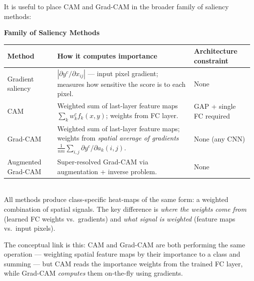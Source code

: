 \documentclass[11pt,a4paper]{article}
\begin{document}
It is useful to place CAM and Grad-CAM in the broader family of saliency methods:

\begin{tcolorbox}[colback=NoteGrayBg,colframe=NoteGray,boxrule=0.8pt,arc=3pt]
\textbf{Family of Saliency Methods}\\[4pt]
\begin{tabularx}{\linewidth}{@{}l X l@{}}
\toprule
\textbf{Method} & \textbf{How it computes importance} & \textbf{Architecture constraint} \\
\midrule
Gradient saliency & $\left|\partial y^c / \partial x_{ij}\right|$ — input pixel gradient; measures how sensitive the score is to each pixel. & None \\[4pt]
CAM & Weighted sum of last-layer feature maps $\sum_k w_k^c f_k(x,y)$; weights from FC layer. & GAP + single FC required \\[4pt]
Grad-CAM & Weighted sum of last-layer feature maps; weights from \emph{spatial average of gradients} $\frac{1}{nm}\sum_{i,j}\partial y^c/\partial a_k(i,j)$. & None (any CNN) \\[4pt]
Augmented Grad-CAM & Super-resolved Grad-CAM via augmentation + inverse problem. & None \\
\bottomrule
\end{tabularx}\\[4pt]
All methods produce class-specific heat-maps of the same form: a weighted combination of spatial signals. The key difference is \emph{where the weights come from} (learned FC weights vs.\ gradients) and \emph{what signal is weighted} (feature maps vs.\ input pixels).
\end{tcolorbox}

The conceptual link is this: CAM and Grad-CAM are both performing the same operation — weighting spatial feature maps by their importance to a class and summing — but CAM reads the importance weights from the trained FC layer, while Grad-CAM \emph{computes} them on-the-fly using gradients.
\end{document}
